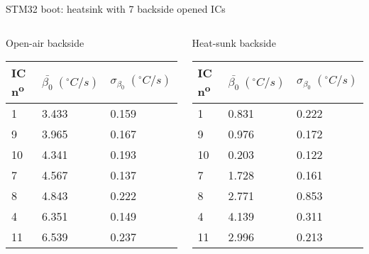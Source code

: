 \begin{frame}{STM32 boot: heatsink with 7 backside opened ICs}
	\begin{columns}
		\begin{column}{0.5\textwidth}
			\centering
			Open-air backside
			\begin{table}[]
				\centering
				\begin{tabular}{|l|l|l|}
					\hline \rule{0pt}{12pt} IC n\textsuperscript{o} & $\bar{\beta_0} \; (^{\circ} C/s)$ & $\sigma_{\beta_0} \; (^{\circ} C/s)$  \\ \hline
					1         & 3.433  & 0.159    \\ \hline
					9         & 3.965  & 0.167    \\ \hline
					10       & 4.341  & 0.193    \\ \hline
					7         & 4.567  & 0.137    \\ \hline
					8         & 4.843  & 0.222    \\ \hline
					4         & 6.351  & 0.149    \\ \hline
					11       & 6.539  & 0.237    \\ \hline
				\end{tabular}
			\end{table}
		\end{column}
		\begin{column}{0.5\textwidth}
			\centering
			Heat-sunk backside
			\begin{table}[]
				\centering
				\begin{tabular}{|l|l|l|}
					\hline \rule{0pt}{12pt} IC n\textsuperscript{o} & $\bar{\beta_0} \; (^{\circ} C/s)$ & $\sigma_{\beta_0} \; (^{\circ} C/s)$  \\ \hline
					1         & 0.831  & 0.222    \\ \hline
					9         & 0.976  & 0.172    \\ \hline
					10       & 0.203  & 0.122    \\ \hline
					7         & 1.728  & 0.161    \\ \hline
					8         & 2.771  & 0.853    \\ \hline
					4         & 4.139  & 0.311    \\ \hline
					11       & 2.996  & 0.213    \\ \hline
				\end{tabular}
			\end{table}
		\end{column}
	\end{columns}
\end{frame}
